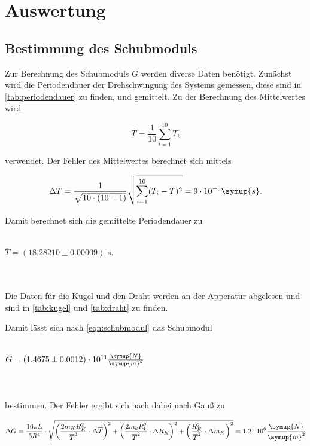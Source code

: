 \section{Auswertung}
\label{sec:Auswertung}
\subsection{Bestimmung des Schubmoduls}



Zur Berechnung des Schubmoduls $G$ werden diverse Daten benötigt. Zunächst wird die Periodendauer der Drehschwingung des Systems gemessen, diese sind in \autoref{tab:periodendauer} zu finden, und gemittelt.
Zu der Berechnung des Mittelwertes wird 

\begin{equation}
  \label{eqn:mittelwert}
  \overline{T} = \frac{1}{10} \sum_{i=1}^{10} T_i
\end{equation}

verwendet. Der Fehler des Mittelwertes berechnet sich mittels 

\begin{equation}
  \label{eqn:FehlerMittelwert}
  \Delta \overline{T} = \frac{1}{\sqrt{10 \cdot (10-1)}} \sqrt{ \sum_{i=1}^{10} (T_i - \overline{T})^2} = 9 \cdot 10^{-5} \symup{s}.
\end{equation}

Damit berechnet sich die gemittelte Periodendauer zu
\\ \\
\centerline{$\overline{T} = (18.28210 \pm 0.00009)$ s.}
\\ \\
Die Daten für die Kugel und den Draht werden an der Apperatur abgelesen und sind in \autoref{tab:kugel} und \autoref{tab:draht} zu finden.





Damit lässt sich nach \eqref{eqn:schubmodul} das Schubmodul
\\ \\
\centerline{$G = (1.4675 \pm 0.0012) \cdot 10^{11} \frac{\symup{N}}{\symup{m}^2}$}
\\ \\
bestimmen. Der Fehler ergibt sich nach dabei nach Gauß zu

\begin{equation}
 \Delta G = \frac{16 \pi L}{5 R^4} \cdot \sqrt{ \bigg( \frac{2 m_K R_K^2}{\overline{T}^3} \cdot \Delta \overline{T} \bigg)^2 + \bigg( \frac{2 m_k R_k^2}{\overline{T}^2} \cdot \Delta R_K \bigg)^2 + \bigg( \frac{R_K^2}{\overline{T}^2} \cdot \Delta m_K \bigg)^2} = 1.2 \cdot 10^{8} \frac{\symup{N}}{\symup{m}^2}
\end{equation}

